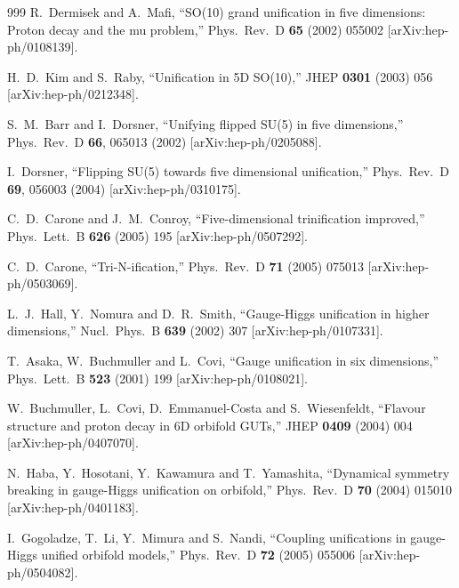 \begin{thebibliography}{999}
  R.~Dermisek and A.~Mafi,
  ``SO(10) grand unification in five dimensions: Proton decay and the mu
  problem,''
  Phys.\ Rev.\ D {\bf 65} (2002) 055002
  [arXiv:hep-ph/0108139].

  H.~D.~Kim and S.~Raby,
  ``Unification in 5D SO(10),''
  JHEP {\bf 0301} (2003) 056
  [arXiv:hep-ph/0212348].

  S.~M.~Barr and I.~Dorsner,
  ``Unifying flipped SU(5) in five dimensions,''
  Phys.\ Rev.\ D {\bf 66}, 065013 (2002)
  [arXiv:hep-ph/0205088].

  I.~Dorsner,
  ``Flipping SU(5) towards five dimensional unification,''
  Phys.\ Rev.\ D {\bf 69}, 056003 (2004)
  [arXiv:hep-ph/0310175].

  C.~D.~Carone and J.~M.~Conroy,
  ``Five-dimensional trinification improved,''
  Phys.\ Lett.\  B {\bf 626} (2005) 195
  [arXiv:hep-ph/0507292].


  C.~D.~Carone,
  ``Tri-N-ification,''
  Phys.\ Rev.\ D {\bf 71} (2005) 075013
  [arXiv:hep-ph/0503069].

  L.~J.~Hall, Y.~Nomura and D.~R.~Smith,
  ``Gauge-Higgs unification in higher dimensions,''
  Nucl.\ Phys.\ B {\bf 639} (2002) 307
  [arXiv:hep-ph/0107331].

  T.~Asaka, W.~Buchmuller and L.~Covi,
  ``Gauge unification in six dimensions,''
  Phys.\ Lett.\ B {\bf 523} (2001) 199
  [arXiv:hep-ph/0108021].

  W.~Buchmuller, L.~Covi, D.~Emmanuel-Costa and S.~Wiesenfeldt,
  ``Flavour structure and proton decay in 6D orbifold GUTs,''
  JHEP {\bf 0409} (2004) 004
  [arXiv:hep-ph/0407070].

  N.~Haba, Y.~Hosotani, Y.~Kawamura and T.~Yamashita,
  ``Dynamical symmetry breaking in gauge-Higgs unification on orbifold,''
  Phys.\ Rev.\ D {\bf 70} (2004) 015010
  [arXiv:hep-ph/0401183].

  I.~Gogoladze, T.~Li, Y.~Mimura and S.~Nandi,
  ``Coupling unifications in gauge-Higgs unified orbifold models,''
  Phys.\ Rev.\  D {\bf 72} (2005) 055006
  [arXiv:hep-ph/0504082].


\end{thebibliography}
